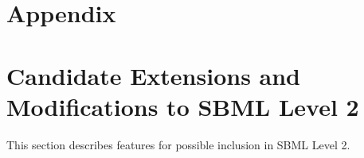 \documentclass[10pt,twocolumntoc]{cekarticle}
\begin{document}

\newpage
\section{Appendix}
\setcounter{secnumdepth}{2}
\appendix
\section{Candidate Extensions and Modifications to SBML Level 2}
\label{apdx:extensions}
This section describes features for possible inclusion in SBML Level 2.

\end{document}
